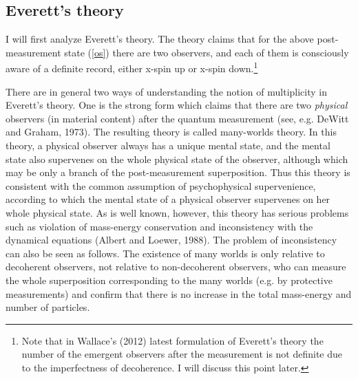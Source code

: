 \subsection{Everett's theory}

I will first analyze Everett's theory.
The theory claims that for the above post-measurement state (\ref{os}) there are two observers, and each of them is consciously aware of a definite record, either x-spin up or x-spin down.\footnote{Note that in Wallace's (2012) latest formulation of Everett's theory the number of the emergent observers after the measurement is not definite due to the imperfectness of decoherence. I will discuss this point later. } %

There are in general two ways of understanding the notion of multiplicity in Everett's  theory.
One is the strong form which claims that there are two \emph{physical} observers (in material content) after the quantum measurement (see, e.g. DeWitt and Graham, 1973). The resulting theory is called many-worlds theory.
In this theory, a physical observer always has a unique mental state, and the mental state also supervenes on the whole physical state of the observer, although which may be only a branch of the post-measurement superposition.  
Thus this theory is consistent with the common assumption of psychophysical supervenience, according to which the mental state of a physical observer supervenes on her whole physical state.
As is well known, however, this theory has serious problems such as violation of mass-energy conservation and inconsistency with the dynamical equations (Albert and Loewer, 1988). The problem of inconsistency can also be seen as follows. The existence of many worlds is only relative to decoherent observers, not relative to non-decoherent observers, who can measure the whole superposition corresponding to the many worlds (e.g. by protective measurements) and confirm that there is no increase in the total mass-energy and number of particles.

